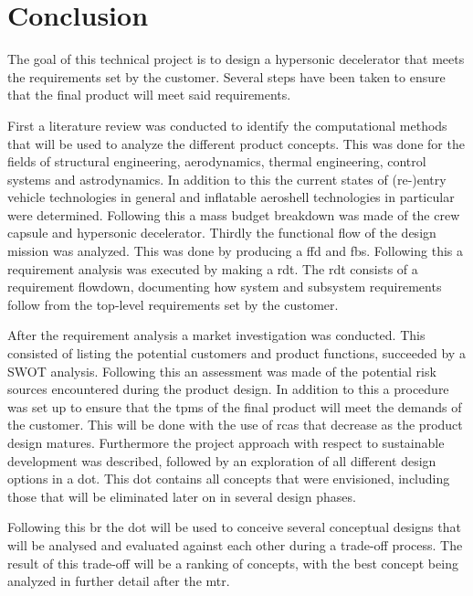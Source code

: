 \section{Conclusion}\label{cha:conclusion}
The goal of this technical project is to design a hypersonic decelerator that meets the requirements set by the customer. Several steps have been taken to ensure that the final product will meet said requirements.

First a literature review was conducted to identify the computational methods that will be used to analyze the different product concepts. This was done for the fields of structural engineering, aerodynamics, thermal engineering, control systems and astrodynamics. In addition to this the current states of (re-)entry vehicle technologies in general and inflatable aeroshell technologies in particular were determined. Following this a mass budget breakdown was made of the crew capsule and hypersonic decelerator. Thirdly the functional flow of the design mission was analyzed. This was done by producing a \acrlong{ffd} and \acrlong{fbs}. Following this a requirement analysis was executed by making a \acrlong{rdt}. The \gls{rdt} consists of a requirement flowdown, documenting how system and subsystem requirements follow from the top-level requirements set by the customer.

After the requirement analysis a market investigation was conducted. This consisted of listing the potential customers and product functions, succeeded by a SWOT analysis. Following this an assessment was made of the potential risk sources encountered during the product design. In addition to this a procedure was set up to ensure that the \acrlong{tpm}s of the final product will meet the demands of the customer. This will be done with the use of \acrlong{rca}s that decrease as the product design matures. Furthermore the project approach with respect to sustainable development was described, followed by an exploration of all different design options in a \acrfull{dot}. This \gls{dot} contains all concepts that were envisioned, including those that will be eliminated later on in several design phases.

Following this \acrfull{br} the \gls{dot} will be used to conceive several conceptual designs that will be analysed and evaluated against each other during a trade-off process. The result of this trade-off will be a ranking of concepts, with the best concept being analyzed in further detail after the \acrfull{mtr}.